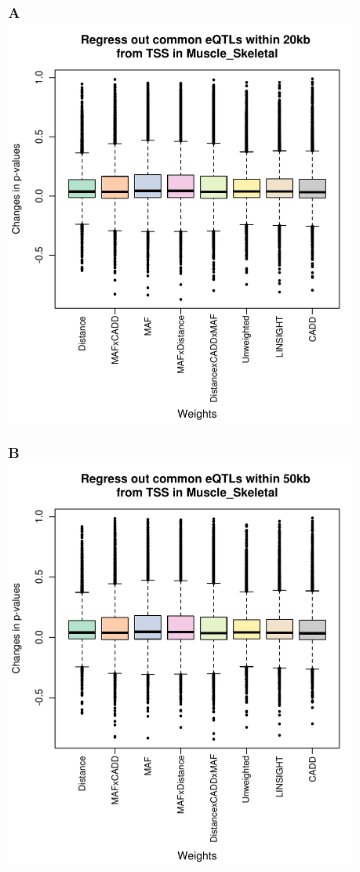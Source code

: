 \documentclass[varwidth=20.5cm,border=4]{standalone}
\begin{document}
\begin{figure}[tb]
    \large
    \begin{subfigure}[t]{0.3\linewidth}
        \textbf{A}
        \includegraphics[width=0.9\linewidth,valign=t]{./changes.p.values.Muscle_Skeletal.20kb.pdf}
    \end{subfigure}
	\hspace{0.1cm}

    \begin{subfigure}[t]{0.3\linewidth}
        \textbf{B}
        \includegraphics[width=0.9\linewidth,valign=t]{./changes.p.values.Muscle_Skeletal.50kb.pdf}
    \end{subfigure}
	\hspace{0.1cm}


\end{figure}
\end{document}
